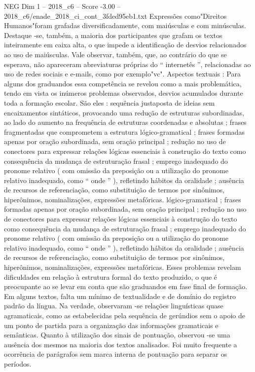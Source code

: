 \begin{textsample}{NEG Dim 1 – 2018\_c6 – Score -3.00 – 2018\_c6/enade\_2018\_ci\_cont\_3fded95eb1.txt}
Expressões como"Direitos Humanos"foram grafadas diversificadamente, com maiúsculas e com minúsculas.
Destaque -se, também, a maioria dos participantes que grafam os textos inteiramente em caixa alta, o que impede a identificação de desvios relacionados ao uso de maiúsculas.
Vale observar, também, que, ao contrário do que se esperava, não apareceram abreviaturas próprias do “ internetês ”, relacionadas ao uso de redes sociais e e-mails, como por exemplo"vc".
Aspectos textuais : Para alguns dos graduandos essa competência se revelou como a mais problemática, tendo em vista os inúmeros problemas observados, desvios acumulados durante toda a formação escolar.
São eles : sequência justaposta de ideias sem encaixamentos sintáticos, provocando uma redução de estruturas subordinadas, ao lado do aumento na frequência de estruturas coordenadas e absolutas ; frases fragmentadas que comprometem a estrutura lógico-gramatical ; frases formadas apenas por oração subordinada, sem oração principal ; redução no uso de conectores para expressar relações lógicas essenciais à construção do texto como consequência da mudança de estruturação frasal ; emprego inadequado do pronome relativo ( com omissão da preposição ou a utilização do pronome relativo inadequado, como “ onde ” ), refletindo hábitos da oralidade ; ausência de recursos de referenciação, como substituição de termos por sinônimos, hiperônimos, nominalizações, expressões metafóricas. lógico-gramatical ; frases formadas apenas por oração subordinada, sem oração principal ; redução no uso de conectores para expressar relações lógicas essenciais à construção do texto como consequência da mudança de estruturação frasal ; emprego inadequado do pronome relativo ( com omissão da preposição ou a utilização do pronome relativo inadequado, como “ onde ” ), refletindo hábitos da oralidade ; ausência de recursos de referenciação, como substituição de termos por sinônimos, hiperônimos, nominalizações, expressões metafóricas.
Esses problemas revelam dificuldades em relação à estrutura formal do texto produzido, o que é preocupante ao se levar em conta que são graduandos em fase final de formação.
Em alguns textos, falta um mínimo de textualidade e de domínio do registro padrão da língua.
Na verdade, observaram -se relações linguísticas quase agramaticais, como as estabelecidas pela sequência de gerúndios sem o apoio de um ponto de partida para a organização das informações gramaticais e semânticas.
Quanto à utilização dos sinais de pontuação, observou -se uma ausência dos mesmos na maioria dos textos analisados.
Foi muito frequente a ocorrência de parágrafos sem marca interna de pontuação para separar os períodos.

\end{textsample}
